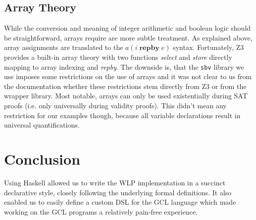 \documentclass[]{scrartcl}
\newcommand{\REPBY}[2]{\ensuremath{#1\;\mathbf{repby}\;#2}}
\begin{document}
\subsection{Array Theory}

While the conversion and meaning of integer arithmetic and boolean logic should be
straightforward, arrays require are more subtle treatment.
As explained above, array assignments are translated to the $a(\REPBY{i}{e})$ syntax.
Fortunately, Z3 provides a built-in array theory with two functions \emph{select} and
\emph{store} directly mapping to array indexing and \emph{repby}.
The downside is, that the \texttt{sbv} library we use imposes some restrictions on the
use of arrays and it was not clear to us from the documentation whether these restrictions
stem directly from Z3 or from the wrapper library.
Most notable, arrays can only be used existentially during SAT proofs (i.e. only universally
during validity proofs).
This didn't mean any restriction for our examples though, because all variable declarations
result in universal quantifications.

\section{Conclusion}

Using Haskell allowed us to write the WLP implementation in a succinct declarative
style, closely following the underlying formal definitions. It also enabled us
to easily define a custom DSL for the GCL language which made working on the GCL
programs a relatively pain-free experience. 
\end{document}
